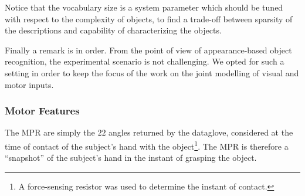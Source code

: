 Notice that the vocabulary size is a system parameter which should be tuned with respect to the complexity of 
objects, to find a trade-off between sparsity of the descriptions and capability of characterizing the objects.           

Finally a remark is in order. From the point of view of appearance-based object recognition, %
the experimental scenario is not challenging.
We opted for such a setting in order to keep the focus of the work on the joint modelling of visual and motor inputs.

\subsubsection{Motor Features}
\label{sec:mot-feat}
The MPR are simply the $22$ angles returned by the dataglove, considered at
the time of contact of the subject's hand with the object\footnote{A
force-sensing resistor was used to determine the instant of contact.}. The
MPR is therefore a ``snapshot'' of the subject's hand in the instant of
grasping the object.



